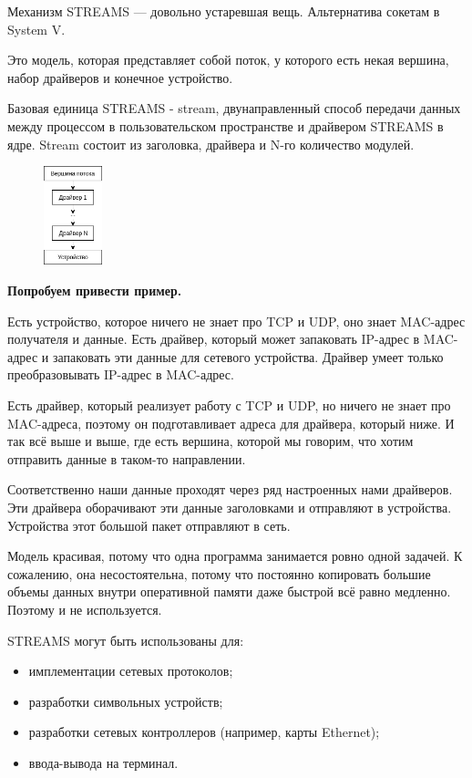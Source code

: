 Механизм STREAMS --- довольно устаревшая вещь. Альтернатива сокетам в System V.

Это модель, которая представляет собой поток, у которого есть некая вершина, набор драйверов и конечное устройство. 

Базовая единица STREAMS - stream, двунаправленный способ передачи данных между процессом в пользовательском пространстве и драйвером STREAMS в ядре. Stream состоит из заголовка, драйвера и N-го количество модулей.

\begin{figure}[htbp]
  \centering
  \includegraphics[width=0.15\textwidth]{./processes-and-threads/processes-interconnection/STREAMS/STREAMS.png}
\end{figure}

\textbf{Попробуем привести пример.}

Есть устройство, которое ничего не знает про TCP и UDP, оно знает MAC-адрес получателя и данные. Есть драйвер, который может запаковать IP-адрес в MAC-адрес и запаковать эти данные для сетевого устройства. Драйвер умеет только преобразовывать IP-адрес в MAC-адрес. 

Есть драйвер, который реализует работу с TCP и UDP, но ничего не знает про MAC-адреса, поэтому он подготавливает адреса для драйвера, который ниже. И так всё выше и выше, где есть вершина, которой мы говорим, что хотим отправить данные в таком-то направлении. 

Соответственно наши данные проходят через ряд настроенных нами драйверов. Эти драйвера оборачивают эти данные заголовками и отправляют в устройства. Устройства этот большой пакет отправляют в сеть. 

Модель красивая, потому что одна программа занимается ровно одной задачей. К сожалению, она несостоятельна, потому что постоянно копировать большие объемы данных внутри оперативной памяти даже быстрой всё равно медленно. Поэтому и не используется. 

STREAMS могут быть использованы для:

\begin{itemize}
	\item имплементации сетевых протоколов;
	\item разработки символьных устройств;
	\item разработки сетевых контроллеров (например, карты Ethernet);
	\item ввода-вывода на терминал.
\end{itemize}
